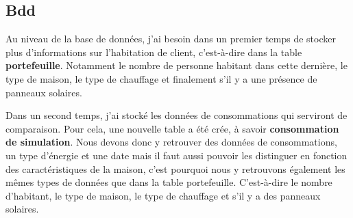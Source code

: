 \subsection{Bdd}

\begin{flushleft}
Au niveau de la base de données, j'ai besoin dans un premier temps de stocker plus d'informations sur l'habitation de client, c'est-à-dire dans la table \textbf{portefeuille}. Notamment le nombre de personne habitant dans cette dernière, le type de maison, le type de chauffage et finalement s'il y a une présence de panneaux solaires.
\end{flushleft}

\begin{flushleft}
Dans un second temps, j'ai stocké les données de consommations qui serviront de comparaison. Pour cela, une nouvelle table a été crée, à savoir \textbf{consommation de simulation}. Nous devons donc y retrouver des données de consommations, un type d'énergie et une date mais il faut aussi pouvoir les distinguer en fonction des caractéristiques de la maison, c'est pourquoi nous y retrouvons également les mêmes types de données que dans la table portefeuille. C'est-à-dire le nombre d'habitant, le type de maison, le type de chauffage et s'il y a des panneaux solaires.
\end{flushleft}


